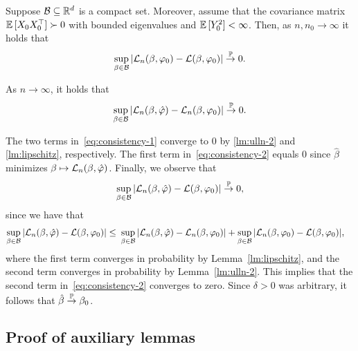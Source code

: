 \begin{lemma}\label{lm:ulln-2}
    Suppose $\mathcal{B} \subseteq \mathbb{R}^d$ is a compact set.
    Moreover, assume that the covariance matrix $\mathbb{E}\,[X_0X_0^\top] \succ 0$ with bounded eigenvalues and $\mathbb{E}\,[Y_0^2] < \infty$.
    Then, as $n, n_0 \to \infty$ it holds that 
    \begin{align}\label{eqn:ulln-2}
            \sup_{\beta \in \mathcal{B}} |\mathcal{L}_n(\beta, \varphi_0) - \mathcal{L}(\beta, \varphi_0)| \stackrel{\mathbb{P}}{\to} 0.
        \end{align}
\end{lemma}
\begin{lemma}\label{lm:lipschitz}
    As $n \to \infty$, it holds that
    \begin{align}\label{eqn:lipschitz}
            \sup_{\beta\in\mathcal{B}}|\mathcal{L}_n(\beta, \hat\varphi) - \mathcal{L}_n(\beta, \varphi_0)| \stackrel{\mathbb{P}}{\to} 0.
        \end{align}
\end{lemma}
The two terms in~\eqref{eq:consistency-1} converge to 0 by \cref{lm:ulln-2} and \cref{lm:lipschitz}, respectively. The first term in~\eqref{eq:consistency-2} equals 0 since $\hat\beta$ minimizes $\beta \mapsto \mathcal{L}_n(\beta, \hat\varphi)$. 
Finally, we observe that \begin{align}\label{eqn:ulln-1}
        \sup_{\beta \in \mathcal{B}} |\mathcal{L}_n(\beta, \hat\varphi) - \mathcal{L}(\beta, \varphi_0)| \stackrel{\mathbb{P}}{\to} 0,
        \end{align}
since we have that
    \begin{align*}
        \sup_{\beta \in \mathcal{B}} |\mathcal{L}_n(\beta, \hat\varphi) - \mathcal{L}(\beta, \varphi_0)|
        \leq &\
        \sup_{\beta \in \mathcal{B}} |\mathcal{L}_n(\beta, \hat\varphi) - \mathcal{L}_n(\beta, \varphi_0)|
        +
        \sup_{\beta \in \mathcal{B}} |\mathcal{L}_n(\beta, \varphi_0) - \mathcal{L}(\beta, \varphi_0)|,
    \end{align*}
    where the first term converges in probability by Lemma~\ref{lm:lipschitz}, and the second term converges in probability by Lemma~\ref{lm:ulln-2}. This implies that the second term in~\eqref{eq:consistency-2} converges to zero. Since $\delta > 0$ was arbitrary, it follows that $\hat{\beta} \stackrel{\mathbb{P}}{\to}\beta_0$.
    

\subsection{Proof of auxiliary lemmas}
\label{sec:auxlemmaproofs}
